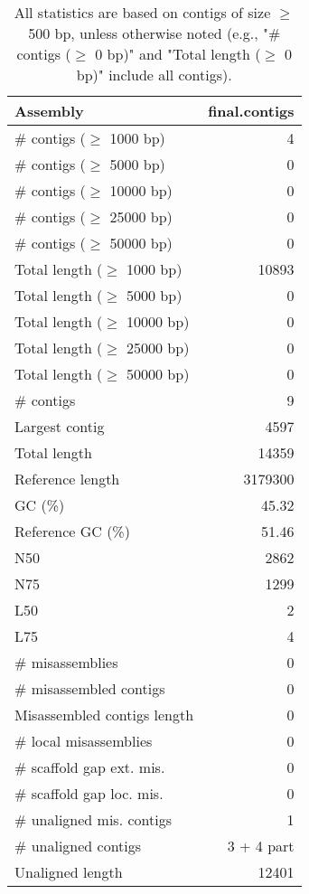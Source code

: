 \documentclass[12pt,a4paper]{article}
\begin{document}
\begin{table}[ht]
\begin{center}
\caption{All statistics are based on contigs of size $\geq$ 500 bp, unless otherwise noted (e.g., "\# contigs ($\geq$ 0 bp)" and "Total length ($\geq$ 0 bp)" include all contigs).}
\begin{tabular}{|l*{1}{|r}|}
\hline
Assembly & final.contigs \\ \hline
\# contigs ($\geq$ 1000 bp) & 4 \\ \hline
\# contigs ($\geq$ 5000 bp) & 0 \\ \hline
\# contigs ($\geq$ 10000 bp) & 0 \\ \hline
\# contigs ($\geq$ 25000 bp) & 0 \\ \hline
\# contigs ($\geq$ 50000 bp) & 0 \\ \hline
Total length ($\geq$ 1000 bp) & 10893 \\ \hline
Total length ($\geq$ 5000 bp) & 0 \\ \hline
Total length ($\geq$ 10000 bp) & 0 \\ \hline
Total length ($\geq$ 25000 bp) & 0 \\ \hline
Total length ($\geq$ 50000 bp) & 0 \\ \hline
\# contigs & 9 \\ \hline
Largest contig & 4597 \\ \hline
Total length & 14359 \\ \hline
Reference length & 3179300 \\ \hline
GC (\%) & 45.32 \\ \hline
Reference GC (\%) & 51.46 \\ \hline
N50 & 2862 \\ \hline
N75 & 1299 \\ \hline
L50 & 2 \\ \hline
L75 & 4 \\ \hline
\# misassemblies & 0 \\ \hline
\# misassembled contigs & 0 \\ \hline
Misassembled contigs length & 0 \\ \hline
\# local misassemblies & 0 \\ \hline
\# scaffold gap ext. mis. & 0 \\ \hline
\# scaffold gap loc. mis. & 0 \\ \hline
\# unaligned mis. contigs & 1 \\ \hline
\# unaligned contigs & 3 + 4 part \\ \hline
Unaligned length & 12401 \\ \hline

\end{tabular}
\end{center}
\end{table}
\end{document}
